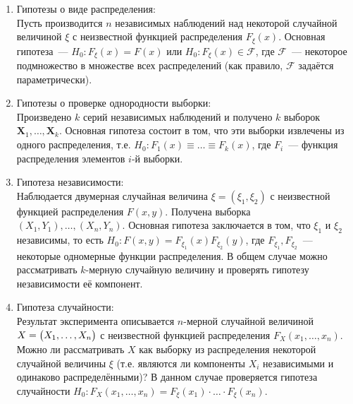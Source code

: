 \begin{enumerate}
    \item 
        Гипотезы о виде распределения: \\
        Пусть производится $n$ независимых наблюдений над некоторой случайной величиной $\xi$ с неизвестной функцией распределения $F_{\xi}(x)$.
        Основная гипотеза~--- $H_0 \colon F_{\xi}(x) = F(x)$ или $H_0 \colon F_{\xi}(x) \in \mathcal{F}$, где $\mathcal{F}$~--- 
        некоторое подмножество в множестве всех распределений (как правило, $\mathcal{F}$ задаётся параметрически).
    \item 
        Гипотезы о проверке однородности выборки: \\
        Произведено $k$ серий независимых наблюдений и получено $k$ выборок $\mathbf{X}_1, \ldots, \mathbf{X}_k$.
        Основная гипотеза состоит в том, что эти выборки извлечены из одного распределения, т.е.
        $H_0 \colon F_1(x) \equiv \ldots \equiv F_k(x)$, где $F_i$~--- функция распределения элементов $i$-й выборки.
    \item 
        Гипотеза независимости: \\
        Наблюдается двумерная случайная величина $\xi = (\xi_1, \xi_2)$ с неизвестной функцией распределения $F(x, y)$.
        Получена выборка $(X_1, Y_1), \ldots, (X_n, Y_n)$.
        Основная гипотеза заключается в том, что $\xi_1$ и $\xi_2$ независимы, 
        то есть $H_0\colon F(x, y) = F_{\xi_1}(x) F_{\xi_2}(y)$, где $F_{\xi_1}, F_{\xi_2}$~--- некоторые одномерные функции распределения.
        В общем случае можно рассматривать $k$-мерную случайную величину и проверять гипотезу независимости её компонент.
        
    \item 
        Гипотеза случайности: \\
        Результат эксперимента описывается $n$-мерной случайной величиной $X = \bigl( X_1, \ldots, X_n \bigr)$ с неизвестной функцией распределения $F_{X}(x_1, \ldots, x_n)$.
        Можно ли рассматривать $X$ как выборку из распределения некоторой случайной величины $\xi$ (т.е. являются ли компоненты $X_i$ независимыми и одинаково распределёнными)?
        В данном случае проверяется гипотеза случайности $H_0\colon F_{X}(x_1, \ldots, x_n) = F_{\xi}(x_1) \cdot \ldots \cdot F_{\xi}(x_n)$.

\end{enumerate}

